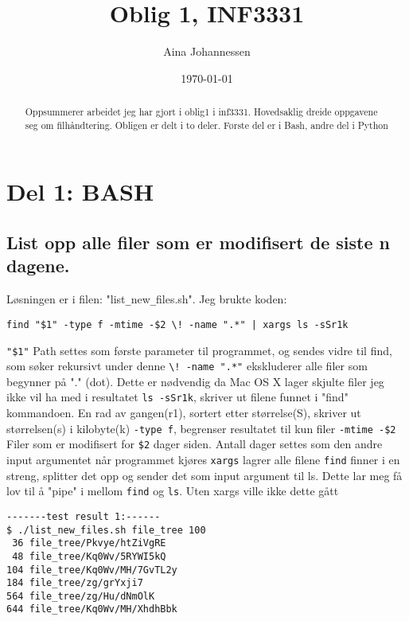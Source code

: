 \documentclass{article}
\begin{document}
\title{Oblig 1, INF3331}

\author{
Aina Johannessen
}

\date{\today}

\maketitle

\begin{abstract}
Oppsummerer arbeidet jeg har gjort i oblig1 i inf3331. Hovedsaklig dreide oppgavene seg om filhåndtering. 
Obligen er delt i to deler. Første del er i Bash, andre del i Python  
\end{abstract}

\section{Del 1: BASH}


 
\subsection{List opp alle filer som er modifisert de siste n dagene.}

Løsningen er i filen: "list\verb;_;new\verb;_;files.sh". Jeg brukte koden:\par
\verb;find "$1" -type f -mtime -$2 \! -name ".*" | xargs ls -sSr1k;\par

\verb;"$1"; Path settes som første parameter til programmet, og sendes vidre til find, som søker rekursivt under denne\newline
\verb;\! -name ".*"; ekskluderer alle filer som begynner på "." (dot). Dette er nødvendig da Mac OS X lager skjulte filer jeg ikke vil ha med i resultatet\newline
\verb;ls -sSr1k;,  skriver ut filene funnet i "find" kommandoen. En rad av gangen(r1), sortert etter størrelse(S), skriver ut størrelsen(s) i kilobyte(k)\newline
\verb;-type f;, begrenser resultatet til kun filer\newline
\verb;-mtime -$2; Filer som er modifisert for \verb;$2; dager siden. Antall dager settes som den andre input argumentet når programmet kjøres\newline
\verb;xargs; lagrer alle filene \verb;find; finner i en streng, splitter det opp og sender det som input argument til ls. Dette lar meg få lov til å "pipe" i mellom \verb;find; og \verb;ls;. Uten xargs ville ikke dette gått
\begin{verbatim} 		
-------test result 1:------
$ ./list_new_files.sh file_tree 100
 36 file_tree/Pkvye/htZiVgRE
 48 file_tree/Kq0Wv/5RYWI5kQ
104 file_tree/Kq0Wv/MH/7GvTL2y
184 file_tree/zg/grYxji7
564 file_tree/zg/Hu/dNmOlK
644 file_tree/Kq0Wv/MH/XhdhBbk
\end{verbatim}
\end{document}
